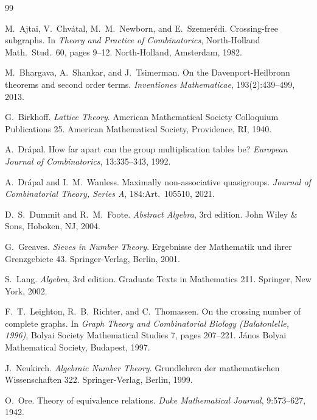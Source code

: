 \documentclass[11pt,reqno]{amsart}
\theoremstyle{plain}
\theoremstyle{definition}
\theoremstyle{remark}
\begin{document}
\begin{thebibliography}{99}

M.~Ajtai, V.~Chv\'atal, M.~M.~Newborn, and E.~Szemer\'edi.
\newblock Crossing-free subgraphs.
\newblock In \emph{Theory and Practice of Combinatorics}, North-Holland
Math.\ Stud.\ 60, pages 9--12. North-Holland, Amsterdam, 1982.

M.~Bhargava, A.~Shankar, and J.~Tsimerman.
\newblock On the Davenport-Heilbronn theorems and second order terms.
\newblock \emph{Inventiones Mathematicae}, 193(2):439--499, 2013.

G.~Birkhoff.
\newblock \emph{Lattice Theory}.
\newblock American Mathematical Society Colloquium Publications 25.
\newblock American Mathematical Society, Providence, RI, 1940.

A.~Dr\'apal.
\newblock How far apart can the group multiplication tables be?
\newblock \emph{European Journal of Combinatorics}, 13:335--343, 1992.

A.~Dr\'apal and I.~M.~Wanless.
\newblock Maximally non-associative quasigroups.
\newblock \emph{Journal of Combinatorial Theory, Series A}, 184:Art.\
105510, 2021.

D.~S.~Dummit and R.~M.~Foote.
\newblock \emph{Abstract Algebra}, 3rd edition.
\newblock John Wiley \& Sons, Hoboken, NJ, 2004.

G.~Greaves.
\newblock \emph{Sieves in Number Theory}.
\newblock Ergebnisse der Mathematik und ihrer Grenzgebiete 43.
Springer-Verlag, Berlin, 2001.

S.~Lang.
\newblock \emph{Algebra}, 3rd edition.
\newblock Graduate Texts in Mathematics 211. Springer, New York, 2002.

F.~T.~Leighton, R.~B.~Richter, and C.~Thomassen.
\newblock On the crossing number of complete graphs.
\newblock In \emph{Graph Theory and Combinatorial Biology
(Balatonlelle, 1996)}, Bolyai Society Mathematical Studies 7,
pages 207--221. J\'anos Bolyai Mathematical Society, Budapest, 1997.

J.~Neukirch.
\newblock \emph{Algebraic Number Theory}.
\newblock Grundlehren der mathematischen Wissenschaften 322.
\newblock Springer-Verlag, Berlin, 1999.

O.~Ore.
\newblock Theory of equivalence relations.
\newblock \emph{Duke Mathematical Journal}, 9:573--627, 1942.


\end{thebibliography}
\end{document}
